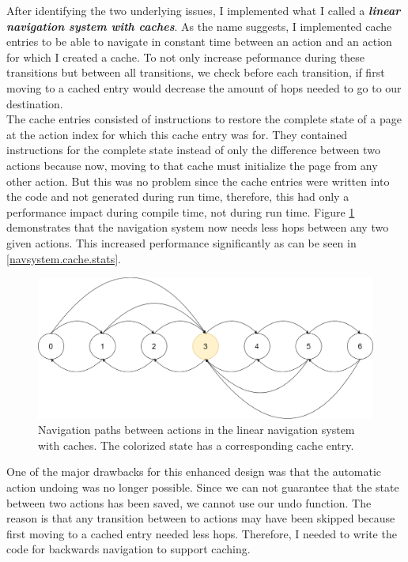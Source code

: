 \par

After identifying the two underlying issues, I implemented what I called a \textbf{\textit{linear navigation system with caches}}. As the name suggests, I implemented cache entries to be able to navigate in constant time between an action and an action for which I created a cache. To not only increase peformance during these transitions but between all transitions, we check before each transition, if first moving to a cached entry would decrease the amount of hops needed to go to our destination.\\
The cache entries consisted of instructions to restore the complete state of a page at the action index for which this cache entry was for. They contained instructions for the complete state instead of only the difference between two actions because now, moving to that cache must initialize the page from any other action. But this was no problem since the cache entries were written into the code and not generated during run time, therefore, this had only a performance impact during compile time, not during run time. Figure \ref{navsystem.cache.overview} demonstrates that the navigation system now needs less hops between any two given actions. This increased performance significantly as can be seen in \ref{navsystem.cache.stats}. \par

\begin{figure}
\caption{Navigation paths between actions in the linear navigation system with caches. The colorized state has a corresponding cache entry.}
\label{navsystem.cache.overview}
\includegraphics[width=\textwidth]{figures/navigationsystem-cache-overview.png}
\end{figure}

One of the major drawbacks for this enhanced design was that the automatic action undoing was no longer possible. Since we can not guarantee that the state between two actions has been saved, we cannot use our undo function. The reason is that any transition between to actions may have been skipped because first moving to a cached entry needed less hops. Therefore, I needed to write the code for backwards navigation to support caching.

\par
